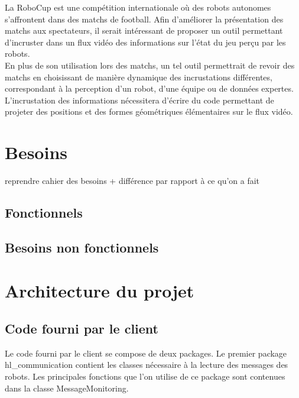 \documentclass[a4paper,12pt]{report}
\begin{document}
La RoboCup est une compétition internationale où des robots autonomes s'affrontent dans des matchs de football. Afin d'améliorer la présentation des matchs aux spectateurs, il serait intéressant de proposer un outil permettant d'incruster dans un flux vidéo des informations sur l'état du jeu perçu par les robots.
\\

En plus de son utilisation lors des matchs, un tel outil permettrait de revoir des matchs en choisissant de manière dynamique des incrustations différentes, correspondant à la perception d'un robot, d'une équipe ou de données expertes.  
\\

L’incrustation des informations nécessitera d'écrire du code permettant de projeter des positions et des formes géométriques élémentaires sur le flux vidéo. 



\newpage



\chapter{Besoins}
 reprendre  cahier des besoins + différence par rapport à ce qu'on a fait
 
\section{Fonctionnels}


\section{Besoins non fonctionnels}

\chapter{Architecture du projet}

   
\section{Code fourni par le client}

Le code fourni par le client se compose de deux packages. 
Le premier package hl\_communication contient les classes nécessaire à la lecture des messages des robots. Les principales fonctions que l'on utilise de ce package sont contenues dans la classe MessageMonitoring.
\\
\end{document}
